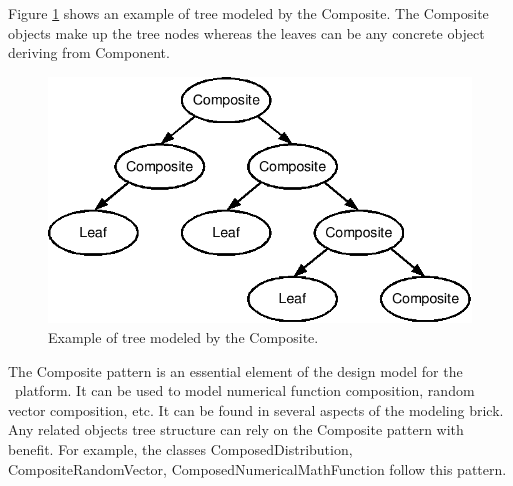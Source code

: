 Figure \ref{fig:composite_tree} shows an example of tree modeled by the Composite. The Composite objects make up the tree nodes whereas the leaves can be any concrete object deriving from Component.

\begin{figure}[htb]
\begin{center}
\includegraphics[scale=0.45]{Figures/modeling_notions/composite_tree.png}
\caption{Example of tree modeled by the Composite.}\label{fig:composite_tree}
\end{center}
\end{figure}

The Composite pattern is an essential element of the design model for the \OT\ platform. It can be used to model numerical function composition, random vector composition, etc. It can be found in several aspects of the modeling brick. Any related objects tree structure can rely on the Composite pattern with benefit.
For example, the classes ComposedDistribution, CompositeRandomVector, ComposedNumericalMathFunction follow this pattern.
